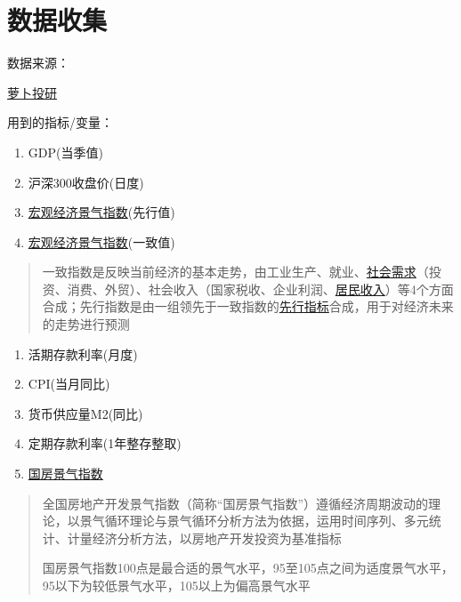 \documentclass[]{article}
\date{}
\begin{document}
\hypertarget{header-n0}{%
\section{数据收集}\label{header-n0}}

数据来源：

\href{https://robo.datayes.com/v2/home}{萝卜投研}

用到的指标/变量：

\begin{enumerate}
\def\labelenumi{\arabic{enumi}.}
\item
  GDP(当季值)
\item
  沪深300收盘价(日度)
\item
  \href{https://baike.baidu.com/item/\%E7\%BB\%8F\%E6\%B5\%8E\%E6\%99\%AF\%E6\%B0\%94\%E6\%8C\%87\%E6\%95\%B0/6782162}{宏观经济景气指数}(先行值)
\item
  \href{https://baike.baidu.com/item/\%E7\%BB\%8F\%E6\%B5\%8E\%E6\%99\%AF\%E6\%B0\%94\%E6\%8C\%87\%E6\%95\%B0/6782162}{宏观经济景气指数}(一致值)
\end{enumerate}

\begin{quote}
一致指数是反映当前经济的基本走势，由工业生产、就业、\href{https://baike.baidu.com/item/\%E7\%A4\%BE\%E4\%BC\%9A\%E9\%9C\%80\%E6\%B1\%82}{社会需求}（投资、消费、外贸）、社会收入（国家税收、企业利润、\href{https://baike.baidu.com/item/\%E5\%B1\%85\%E6\%B0\%91\%E6\%94\%B6\%E5\%85\%A5}{居民收入}）等4个方面合成；先行指数是由一组领先于一致指数的\href{https://baike.baidu.com/item/\%E5\%85\%88\%E8\%A1\%8C\%E6\%8C\%87\%E6\%A0\%87}{先行指标}合成，用于对经济未来的走势进行预测
\end{quote}

\begin{enumerate}
\def\labelenumi{\arabic{enumi}.}
\item
  活期存款利率(月度)
\item
  CPI(当月同比)
\item
  货币供应量M2(同比)
\item
  定期存款利率(1年整存整取)
\item
  \href{https://baike.baidu.com/item/\%E5\%9B\%BD\%E6\%88\%BF\%E6\%99\%AF\%E6\%B0\%94\%E6\%8C\%87\%E6\%95\%B0/7035576}{国房景气指数}
\end{enumerate}

\begin{quote}
全国房地产开发景气指数（简称``国房景气指数''）遵循经济周期波动的理论，以景气循环理论与景气循环分析方法为依据，运用时间序列、多元统计、计量经济分析方法，以房地产开发投资为基准指标

国房景气指数100点是最合适的景气水平，95至105点之间为适度景气水平，95以下为较低景气水平，105以上为偏高景气水平
\end{quote}
\end{document}
